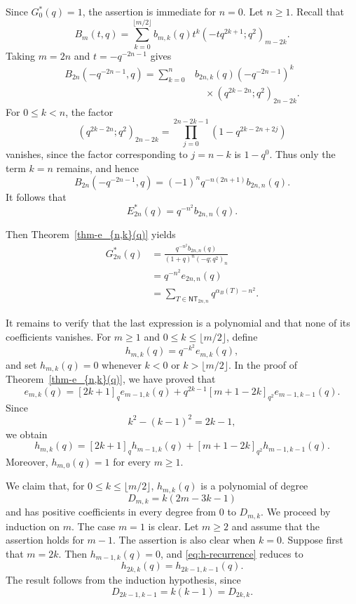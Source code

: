 \documentclass[12pt]{article}
\numberwithin{equation}{section}
\theoremstyle{plain}
\begin{document}
	 				 
	 				Since $G_0^{*}(q)=1$, the assertion is immediate for $n=0$. Let
	 				$n\geq 1$. Recall that
	 				\[
	 				B_m(t,q)=\sum_{k=0}^{\lfloor m/2\rfloor}
	 				b_{m,k}(q)t^k(-tq^{2k+1};q^2)_{m-2k}.
	 				\]
	 				Taking $m=2n$ and $t=-q^{-2n-1}$ gives
	 				\[
	 				\begin{aligned}
	 					B_{2n}(-q^{-2n-1},q)
	 					=\sum_{k=0}^{n}{}&b_{2n,k}(q)(-q^{-2n-1})^k\\
	 					&\quad\times(q^{2k-2n};q^2)_{2n-2k}.
	 				\end{aligned}
	 				\]
	 				For $0\leq k<n$, the factor
	 			\[
	 			(q^{2k-2n};q^2)_{2n-2k}
	 			=\prod_{j=0}^{2n-2k-1}
	 			(1-q^{2k-2n+2j})
	 			\]
	 			vanishes, since the factor corresponding to $j=n-k$ is
	 			$1-q^0$. Thus only the term $k=n$ remains, and hence
	 			\[
	 			B_{2n}(-q^{-2n-1},q)
	 			=(-1)^nq^{-n(2n+1)}b_{2n,n}(q).
	 			\]
	 			It follows that
	 			\[
	 			E_{2n}^{*}(q)=q^{-n^2}b_{2n,n}(q).
	 			\]
	 				 
	 				Then Theorem~\ref{thm-e_{n,k}(q)} yields
	 				\[
	 				\begin{aligned}
	 					G_{2n}^{*}(q)
	 					&=\frac{q^{-n^2}b_{2n,n}(q)}{(1+q)^n(-q;q^2)_n}\\
	 					&=q^{-n^2}e_{2n,n}(q)\\
	 					&=\sum_{T\in\mathsf{NT}_{2n,n}}q^{\alpha_B(T)-n^2}.
	 				\end{aligned}
	 				\]
	 				
	 			It remains to verify that the last expression is a polynomial and that
	 			none of its coefficients vanishes. For $m\geq 1$ and
	 			$0\leq k\leq\lfloor m/2\rfloor$, define
	 			\[
	 			h_{m,k}(q)=q^{-k^2}e_{m,k}(q),
	 			\]
	 			and set $h_{m,k}(q)=0$ whenever $k<0$ or $k>\lfloor m/2\rfloor$.
	 			In the proof of Theorem~\ref{thm-e_{n,k}(q)}, we have proved that 
	 			\[
	 			e_{m,k}(q)=[2k+1]_q e_{m-1,k}(q)
	 			+q^{2k-1}[m+1-2k]_{q^2}e_{m-1,k-1}(q).
	 			\]
	 			Since
	 			\[
	 			k^2-(k-1)^2=2k-1,
	 			\]
	 			we obtain
	 			\begin{equation}\label{eq:h-recurrence}
	 				h_{m,k}(q)=[2k+1]_q h_{m-1,k}(q)
	 				+[m+1-2k]_{q^2}h_{m-1,k-1}(q).
	 			\end{equation}
	 			Moreover, $h_{m,0}(q)=1$ for every $m\geq 1$.
	 			
	 			We claim that, for $0\leq k\leq\lfloor m/2\rfloor$,
	 			$h_{m,k}(q)$ is a polynomial of degree
	 			\[
	 			D_{m,k}=k(2m-3k-1)
	 			\]
	 			and has positive coefficients in every degree from $0$ to $D_{m,k}$.
	 			We proceed by induction on $m$. The case $m=1$ is clear. Let $m\geq2$
	 			and assume that the assertion holds for $m-1$. The assertion is also
	 			clear when $k=0$. Suppose first that $m=2k$. Then
	 			$h_{m-1,k}(q)=0$, and
	 			\eqref{eq:h-recurrence} reduces to
	 			\[
	 			h_{2k,k}(q)=h_{2k-1,k-1}(q).
	 			\]
	 			The result follows from the induction hypothesis, since
	 			\[
	 			D_{2k-1,k-1}=k(k-1)=D_{2k,k}.
	 			\]
	 			
\end{document}
